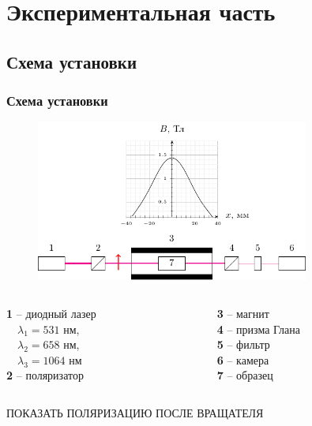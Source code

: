 \documentclass[10pt,pdf,hyperref={unicode}, dvipsnames, handout]{beamer}
\begin{document}
\section{Экспериментальная часть}
\begin{frame}
	\subsection{Схема установки}
	\frametitle{Схема установки}
	\begin{figure}[tb]
		\centering
		\includegraphics[width=0.8\textwidth]{img/chem}
	\end{figure}
	\begin{columns}
		\hspace{2.5cm}
		\begin{column}{0.3\textwidth}
			\textbf{1} -- диодный лазер\\ 
			$\quad\lambda_1=531$ нм,\\
			$\quad\lambda_2=658$ нм,\\
			$\quad\lambda_3=1064$ нм\\
			\textbf{2} -- поляризатор
		\end{column}
		\hspace{1.6cm}
		\begin{column}{0.7\textwidth}
			\textbf{3} -- магнит\\
			\textbf{4} -- призма Глана\\
			\textbf{5} -- фильтр\\
			\textbf{6} -- камера\\
			\textbf{7} -- образец
		\end{column}
	\end{columns}
	ПОКАЗАТЬ ПОЛЯРИЗАЦИЮ ПОСЛЕ ВРАЩАТЕЛЯ
\end{frame}
\end{document}
